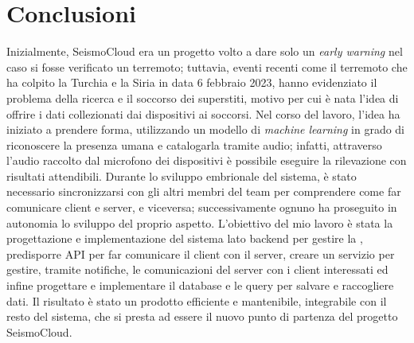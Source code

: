 \documentclass[main.tex]{subfiles}
\begin{document}
\sloppy

\section{Conclusioni}%
\vspace{1.0cm}
Inizialmente, SeismoCloud era un progetto volto a dare solo un \emph{early warning} nel caso si fosse verificato un terremoto; tuttavia, eventi recenti come il terremoto che ha colpito la Turchia e la Siria in data 6 febbraio 2023, hanno evidenziato il problema della ricerca e il soccorso dei superstiti, motivo per cui è nata l'idea di offrire i dati collezionati dai dispositivi ai soccorsi. Nel corso del lavoro, l’idea ha iniziato a prendere forma, utilizzando un modello di \emph{machine learning} in grado di riconoscere la presenza umana e catalogarla tramite audio; infatti, attraverso l'audio raccolto dal microfono dei dispositivi è possibile eseguire la rilevazione con risultati attendibili.\newline
Durante lo sviluppo embrionale del sistema, è stato necessario sincronizzarsi con gli altri membri del team per comprendere come far comunicare client e server, e viceversa; successivamente ognuno ha proseguito in autonomia lo sviluppo del proprio aspetto. \newline
L'obiettivo del mio lavoro è stata la progettazione e implementazione del sistema lato backend per gestire la , predisporre API per far comunicare il client con il server, creare un servizio per gestire, tramite notifiche, le comunicazioni del server con i client interessati ed infine progettare e implementare il database e le query per salvare e raccogliere dati. Il risultato è stato un prodotto efficiente e mantenibile, integrabile con il resto del sistema, che si presta ad essere il nuovo punto di partenza del progetto SeismoCloud.
\end{document}
